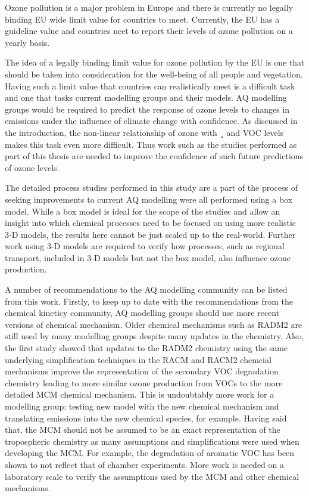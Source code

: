 Ozone pollution is a major problem in Europe and there is currently no legally binding EU wide limit value for countries to meet.
Currently, the EU has a guideline value and countries neet to report their levels of ozone pollution on a yearly basis. 

The idea of a legally binding limit value for ozone pollution by the EU is one that should be taken into consideration for the well-being of all people and vegetation.
Having such a limit value that countries can realistically meet is a difficult task and one that tasks current modelling groups and their models.
AQ modelling groups would be required to predict the response of ozone levels to changes in emissions under the influence of climate change with confidence.
As discussed in the introduction, the non-linear relationship of ozone with ¸ and VOC levels makes this task even more difficult.
Thus work such as the studies performed as part of this thesis are needed to improve the confidence of such future predictions of ozone levels.

The detailed process studies performed in this study are a part of the process of seeking improvements to current AQ modelling were all performed using a box model.
While a box model is ideal for the scope of the studies and allow an insight into which chemical processes need to be focused on using more realistic 3-D models, the results here cannot be just scaled up to the real-world.
Further work using 3-D models are required to verify how processes, such as regional transport, included in 3-D models but not the box model, also influence ozone production.

A number of recommendations to the AQ modelling community can be listed from this work.
Firstly, to keep up to date with the recommendations from the chemical kineticy community, AQ modelling groups should use more recent versions of chemical mechanism.
Older chemical mechanisms such as RADM2 are still used by many modelling groups despite many updates in the chemistry. 
Also, the first study showed that updates to the RADM2 chemistry using the same underlying simplification techniques in the RACM and RACM2 chemcial mechanisms improve the representation of the secondary VOC degradation chemistry leading to more similar ozone production from VOCs to the more detailed MCM chemical mechanism.
This is undoubtably more work for a modelling group: testing new model with the new chemical mechanism and translating emissions into the new chemical species, for example.
Having said that, the MCM should not be assumed to be an exact representation of the tropospheric chemistry as many assumptions and simplifications were used when developing the MCM.
For example, the degradation of aromatic VOC has been shown to not reflect that of chamber experiments.
More work is needed on a laboratory scale to verify the assumptions used by the MCM and other chemical mechanisms.

